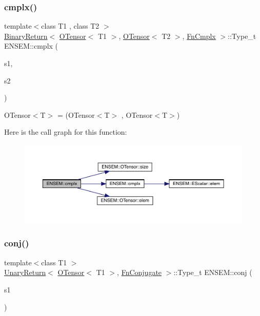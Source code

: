 \subsubsection{\texorpdfstring{cmplx()}{cmplx()}}
{\footnotesize\ttfamily template$<$class T1 , class T2 $>$ \\
\mbox{\hyperlink{structENSEM_1_1BinaryReturn}{Binary\+Return}}$<$ \mbox{\hyperlink{classENSEM_1_1OTensor}{O\+Tensor}}$<$ T1 $>$, \mbox{\hyperlink{classENSEM_1_1OTensor}{O\+Tensor}}$<$ T2 $>$, \mbox{\hyperlink{structENSEM_1_1FnCmplx}{Fn\+Cmplx}} $>$\+::Type\+\_\+t E\+N\+S\+E\+M\+::cmplx (\begin{DoxyParamCaption}\item[{const \mbox{\hyperlink{classENSEM_1_1OTensor}{O\+Tensor}}$<$ T1 $>$ \&}]{s1,  }\item[{const \mbox{\hyperlink{classENSEM_1_1OTensor}{O\+Tensor}}$<$ T2 $>$ \&}]{s2 }\end{DoxyParamCaption})\hspace{0.3cm}{\ttfamily [inline]}}



O\+Tensor$<$\+T$>$ = (O\+Tensor$<$\+T$>$ , O\+Tensor$<$\+T$>$) 

Here is the call graph for this function\+:\nopagebreak
\begin{figure}[H]
\begin{center}
\leavevmode
\includegraphics[width=350pt]{de/d87/group__obstensor_gaabe3804eba50d35ba93cf516f1e5a85b_cgraph}
\end{center}
\end{figure}
\mbox{\label{group__obstensor_ga53d2641f95a433640eadd4ab33fed1ba}} 
\subsubsection{\texorpdfstring{conj()}{conj()}}
{\footnotesize\ttfamily template$<$class T1 $>$ \\
\mbox{\hyperlink{structENSEM_1_1UnaryReturn}{Unary\+Return}}$<$ \mbox{\hyperlink{classENSEM_1_1OTensor}{O\+Tensor}}$<$ T1 $>$, \mbox{\hyperlink{structENSEM_1_1FnConjugate}{Fn\+Conjugate}} $>$\+::Type\+\_\+t E\+N\+S\+E\+M\+::conj (\begin{DoxyParamCaption}\item[{const \mbox{\hyperlink{classENSEM_1_1OTensor}{O\+Tensor}}$<$ T1 $>$ \&}]{s1 }\end{DoxyParamCaption})\hspace{0.3cm}{\ttfamily [inline]}}


